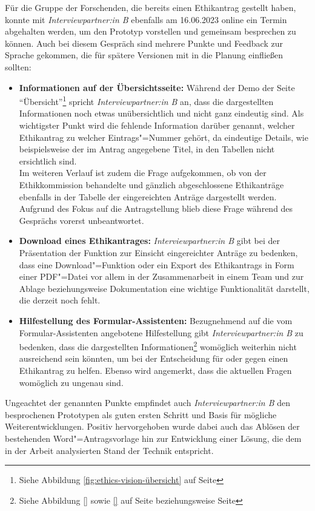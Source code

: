 \documentclass[a4paper,12pt,twoside]{scrreprt}
\begin{document}
Für die Gruppe der Forschenden, die bereits einen Ethikantrag gestellt haben, konnte mit \textit{Interviewpartner:in B} ebenfalls am 16.06.2023 online ein Termin abgehalten werden, um den Prototyp vorstellen und gemeinsam besprechen zu können. Auch bei diesem Gespräch sind mehrere Punkte und Feedback zur Sprache gekommen, die für spätere Versionen mit in die Planung einfließen sollten:
\begin{itemize}
    \item \textbf{Informationen auf der Übersichtsseite:} Während der Demo der Seite \enquote{Übersicht}\footnote{Siehe Abbildung \ref{fig:ethics-vision-übersicht} auf Seite \pageref{fig:ethics-vision-übersicht}} spricht \textit{Interviewpartner:in B} an, dass die dargestellten Informationen noch etwas unübersichtlich und nicht ganz eindeutig sind. Als wichtigster Punkt wird die fehlende Information darüber genannt, welcher Ethikantrag zu welcher Eintrags"=Nummer gehört, da eindeutige Details, wie beispielsweise der im Antrag angegebene Titel, in den Tabellen nicht ersichtlich sind.\\
    Im weiteren Verlauf ist zudem die Frage aufgekommen, ob von der Ethikkommission behandelte und gänzlich abgeschlossene Ethikanträge ebenfalls in der Tabelle der eingereichten Anträge dargestellt werden. Aufgrund des Fokus auf die Antragstellung blieb diese Frage während des Gesprächs vorerst unbeantwortet.
    \item \textbf{Download eines Ethikantrages:} \textit{Interviewpartner:in B} gibt bei der Präsentation der Funktion zur Einsicht eingereichter Anträge zu bedenken, dass eine Download"=Funktion oder ein Export des Ethikantrags in Form einer PDF"=Datei vor allem in der Zusammenarbeit in einem Team und zur Ablage beziehungsweise Dokumentation eine wichtige Funktionalität darstellt, die derzeit noch fehlt. 
    \item \textbf{Hilfestellung des Formular-Assistenten:} Bezugnehmend auf die vom Formular-Assistenten angebotene Hilfestellung gibt \textit{Interviewpartner:in B} zu bedenken, dass die dargestellten Informationen\footnote{Siehe Abbildung \ref{} sowie \ref{} auf Seite \pageref{} beziehungsweise Seite \pageref{}} womöglich weiterhin nicht ausreichend sein könnten, um bei der Entscheidung für oder gegen einen Ethikantrag zu helfen. Ebenso wird angemerkt, dass die aktuellen Fragen womöglich zu ungenau sind.
\end{itemize}

Ungeachtet der genannten Punkte empfindet auch \textit{Interviewpartner:in B} den besprochenen Prototypen als guten ersten Schritt und Basis für mögliche Weiterentwicklungen. Positiv hervorgehoben wurde dabei auch das Ablösen der bestehenden Word"=Antragsvorlage hin zur Entwicklung einer Lösung, die dem in der Arbeit analysierten Stand der Technik entspricht.
\end{document}
